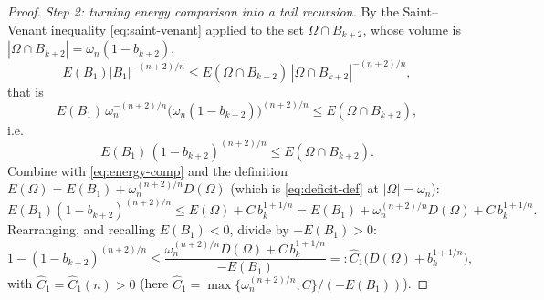 \documentclass[11pt]{amsart}
\theoremstyle{definition}
\newcommand{\Om}{\Omega}
\newcommand{\abs}[1]{\left|#1\right|}
\begin{document}
\begin{proof}
\smallskip
\emph{Step 2: turning energy comparison into a tail recursion.}
By the Saint--Venant inequality \eqref{eq:saint-venant} applied to the
set $\Om\cap B_{k+2}$, whose volume is
$\abs{\Om\cap B_{k+2}}=\omega_n(1-b_{k+2})$,
\[
   E(B_1)\abs{B_1}^{-(n+2)/n}
   \le E(\Om\cap B_{k+2})\,\abs{\Om\cap B_{k+2}}^{-(n+2)/n},
\]
that is
\[
   E(B_1)\,\omega_n^{-(n+2)/n}\bigl(\omega_n(1-b_{k+2})\bigr)^{(n+2)/n}
   \le E(\Om\cap B_{k+2}),
\]
i.e.
\[
   E(B_1)\,(1-b_{k+2})^{(n+2)/n}\le E(\Om\cap B_{k+2}).
\]
Combine with \eqref{eq:energy-comp} and the definition
$E(\Om)=E(B_1)+\omega_n^{(n+2)/n}D(\Om)$ (which is
\eqref{eq:deficit-def} at $\abs{\Om}=\omega_n$):
\[
   E(B_1)(1-b_{k+2})^{(n+2)/n}
   \le E(\Om)+C\,b_k^{1+1/n}
   = E(B_1)+\omega_n^{(n+2)/n}D(\Om)+C\,b_k^{1+1/n}.
\]
Rearranging, and recalling $E(B_1)<0$, divide by $-E(B_1)>0$:
\[
   1-(1-b_{k+2})^{(n+2)/n}
   \le\frac{\omega_n^{(n+2)/n}D(\Om)+C\,b_k^{1+1/n}}{-E(B_1)}
   =:\widehat C_1\bigl(D(\Om)+b_k^{1+1/n}\bigr),
\]
with $\widehat C_1=\widehat C_1(n)>0$
(here $\widehat C_1=\max\{\omega_n^{(n+2)/n},C\}/(-E(B_1))$).

\end{proof}
\end{document}
